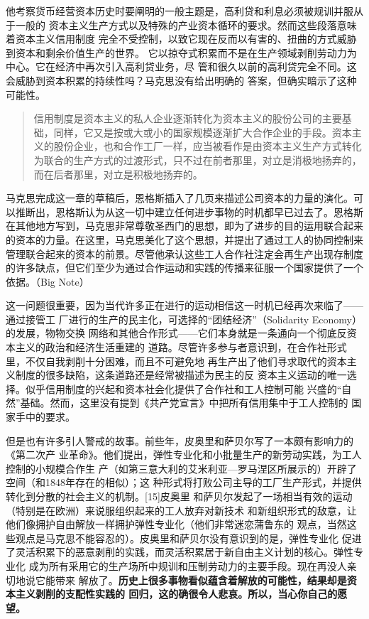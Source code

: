 他考察货币经营资本历史时要阐明的一般主题是，高利贷和利息必须被规训并服从于一般的
资本主义生产方式以及特殊的产业资本循环的要求。然而这些段落意味着资本主义信用制度
完全不受控制，以致它现在反而以有害的、扭曲的方式威胁到资本和剩余价值生产的世界。
它以掠夺式积累而不是在生产领域剥削劳动力为中心。它在经济中再次引入高利贷业务，尽
管和很久以前的高利贷完全不同。这会威胁到资本积累的持续性吗？马克思没有给出明确的
答案，但确实暗示了这种可能性。

\begin{quotation}


信用制度是资本主义的私人企业逐渐转化为资本主义的股份公司的主要基础，同样，它又是按或大或小的国家规模逐渐扩大合作企业的手段。资本主义的股份企业，也和合作工厂一样，应当被看作是由资本主义生产方式转化为联合的生产方式的过渡形式，只不过在前者那里，对立是消极地扬弃的，而在后者那里，对立是积极地扬弃的。 

\end{quotation}
马克思完成这一章的草稿后，恩格斯插入了几页来描述公司资本的力量的演化。可以推断出，恩格斯认为从这一切中建立任何进步事物的时机都早已过去了。恩格斯在其他地方写到，马克思非常尊敬圣西门的思想，即为了进步的目的运用联合起来的资本的力量。在这里，马克思美化了这个思想，并提出了通过工人的协同控制来管理联合起来的资本的前景。尽管他承认这些工人合作社注定会再生产出现存制度的许多缺点，但它们至少为通过合作运动和实践的传播来征服一个国家提供了一个依据。（Big Note）

这一问题很重要，因为当代许多正在进行的运动相信这一时机已经再次来临了——通过接管工
厂进行的生产的民主化，可选择的“团结经济”（Solidarity Economy）的发展，物物交换
网络和其他合作形式——它们本身就是一条通向一个彻底反资本主义的政治和经济生活重建的
道路。尽管许多参与者意识到，在合作社形式里，不仅自我剥削十分困难，而且不可避免地
再生产出了他们寻求取代的资本主义制度的很多缺陷，这条道路还是经常被描述为民主的反
资本主义运动的唯一选择。似乎信用制度的兴起和资本社会化提供了合作社和工人控制可能
兴盛的“自然”基础。然而，这里没有提到《共产党宣言》中把所有信用集中于工人控制的
国家手中的要求。

但是也有许多引人警戒的故事。前些年，皮奥里和萨贝尔写了一本颇有影响力的《第二次产
业革命》。他们提出，弹性专业化和小批量生产的新劳动实践，为工人控制的小规模合作生
产（如第三意大利的艾米利亚—罗马涅区所展示的）开辟了空间（和1848年存在的相似）；这
种形式将打败公司主导的工厂生产形式，并提供转化到分散的社会主义的机制。[15]皮奥里
和萨贝尔发起了一场相当有效的运动（特别是在欧洲）来说服组织起来的工人放弃对新技术
和新组织形式的敌意，让他们像拥护自由解放一样拥护弹性专业化（他们非常迷恋蒲鲁东的
观点，当然这些观点是马克思不能容忍的）。皮奥里和萨贝尔没有意识到的是，弹性专业化
促进了灵活积累下的恶意剥削的实践，而灵活积累居于新自由主义计划的核心。弹性专业化
成为所有采用它的生产场所中规训和压制劳动力的主要手段。现在再没人亲切地说它能带来
解放了。\textbf{历史上很多事物看似蕴含着解放的可能性，结果却是资本主义剥削的支配性实践的
回归，这的确很令人悲哀。所以，当心你自己的愿望。}

